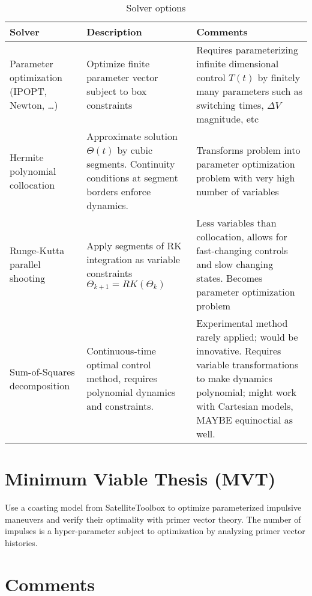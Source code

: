 \begin{table}[htbp]
    \centering
    \begin{tabular}{>{\centering\arraybackslash}m{5cm}>{\centering\arraybackslash}m{5cm}>{\centering\arraybackslash}m{5cm}}\toprule
        \textbf{Solver} & \textbf{Description} & \textbf{Comments} \\ \midrule
        Parameter optimization (IPOPT, Newton, \dots) & Optimize finite parameter vector subject to box constraints & Requires parameterizing infinite dimensional control \(T(t)\) by finitely many parameters such as switching times, \(\Delta V\) magnitude, etc \\ \midrule
        Hermite polynomial collocation & Approximate solution \(\Theta(t)\) by cubic segments. Continuity conditions at segment borders enforce dynamics. & Transforms problem into parameter optimization problem with very high number of variables \\ \midrule
        Runge-Kutta parallel shooting & Apply segments of RK integration as variable constraints \(\Theta_{k+1} = RK(\Theta_k)\) & Less variables than collocation, allows for fast-changing controls and slow changing states. Becomes parameter optimization problem \\ \midrule
        Sum-of-Squares decomposition & Continuous-time optimal control method, requires polynomial dynamics and constraints. & Experimental method rarely applied; would be innovative. Requires variable transformations to make dynamics polynomial; might work with Cartesian models, MAYBE equinoctial as well. \\ \bottomrule
    \end{tabular}
    \caption{Solver options}\label{tab:solvers}
\end{table}

\section{Minimum Viable Thesis (MVT)}

Use a coasting model from SatelliteToolbox to optimize parameterized impulsive maneuvers and verify their optimality with primer vector theory. The number of impulses is a hyper-parameter subject to optimization by analyzing primer vector histories. 

\section{Comments}

